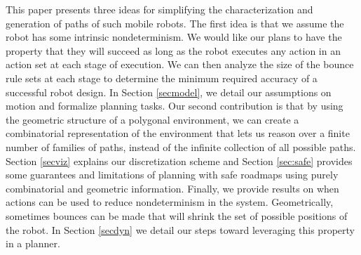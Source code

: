 \documentclass[sageh,times,Review]{sagej}
\begin{document}
This paper presents three ideas for simplifying the characterization and
generation of paths of such mobile robots. The first idea is that we assume 
the robot has some intrinsic
nondeterminism. We would like our plans to have the property that they will
succeed as long as the
robot executes any action in an action set at each stage of execution.
We can then analyze the size of the bounce rule sets at each stage to
determine the minimum required accuracy of a successful robot design. In Section
\ref{secmodel}, we detail our assumptions on motion and formalize planning tasks.
Our second contribution is that by using the geometric
structure of a polygonal environment, we can create a combinatorial
representation of the environment that lets us reason over a finite number of
families of paths, instead of the infinite collection of all possible paths.
Section \ref{secviz} explains our discretization scheme and Section
\ref{sec:safe} provides some guarantees and limitations of planning with safe roadmaps 
using purely combinatorial and geometric information.
Finally, we provide results on when actions can be used to reduce
nondeterminism in the system. Geometrically, sometimes bounces can be made
that will shrink the set of possible positions of the robot.
In Section \ref{secdyn} we detail our steps toward leveraging this property in a planner.
\end{document}
